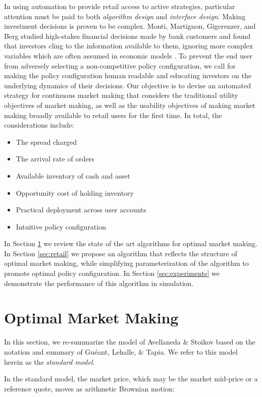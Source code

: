 \documentclass{article}
\begin{document}
In using automation to provide retail access to active strategies, particular attention must be paid to both \emph{algorithm design} and \emph{interface design}. Making investment decisions is proven to be complex. Monti, Martignon, Gigerenzer, and Berg studied high-stakes financial decisions made by bank customers and found that investors cling to the information available to them, ignoring more complex variables which are often assumed in economic models \cite{monti2009impact}. To prevent the end user from adversely selecting a non-competitive policy configuration, we call for making the policy configuration human readable and educating investors on the underlying dynamics of their decisions. Our objective is to devise an automated strategy for continuous market making that considers the traditional utility objectives of market making, as well as the usability objectives of making market making broadly available to retail users for the first time. In total, the considerations include:

\begin{itemize}
  \item The spread charged
  \item The arrival rate of orders
  \item Available inventory of cash and asset
  \item Opportunity cost of holding inventory
  \item Practical deployment across user accounts
  \item Intuitive policy configuration
\end{itemize}

In Section \ref{sec:optimal} we review the state of the art algorithms for optimal market making. In Section \ref{sec:retail} we propose an algorithm that reflects the structure of optimal market making, while simplifying parameterization of the algorithm to promote optimal policy configuration. In Section \ref{sec:experiments} we demonstrate the performance of this algorithm in simulation.

\section{Optimal Market Making}
\label{sec:optimal}

In this section, we re-summarize the model of Avellaneda \& Stoikov based on the notation and summary of Guéant, Lehalle, \& Tapia. We refer to this model herein as the \emph{standard model}.

In the standard model, the market price, which may be the market mid-price or a reference quote, moves as arithmetic Brownian motion:
\end{document}
